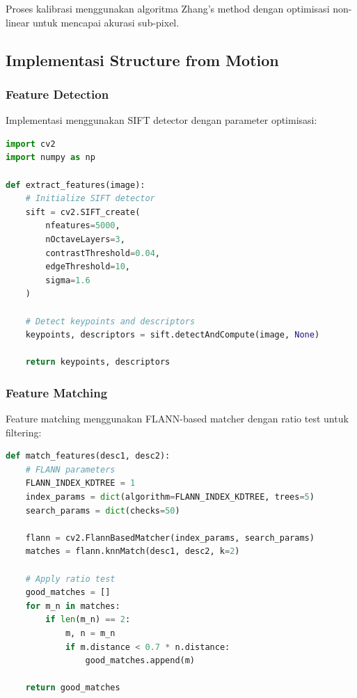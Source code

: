 \documentclass[12pt,a4paper]{article}
\begin{document}
Proses kalibrasi menggunakan algoritma Zhang's method dengan optimisasi non-linear untuk mencapai akurasi sub-pixel.

\subsection{Implementasi Structure from Motion}

\subsubsection{Feature Detection}

Implementasi menggunakan SIFT detector dengan parameter optimisasi:

\begin{lstlisting}[language=Python, caption=Implementasi SIFT Feature Detection]
import cv2
import numpy as np

def extract_features(image):
    # Initialize SIFT detector
    sift = cv2.SIFT_create(
        nfeatures=5000,
        nOctaveLayers=3,
        contrastThreshold=0.04,
        edgeThreshold=10,
        sigma=1.6
    )
    
    # Detect keypoints and descriptors
    keypoints, descriptors = sift.detectAndCompute(image, None)
    
    return keypoints, descriptors
\end{lstlisting}

\subsubsection{Feature Matching}

Feature matching menggunakan FLANN-based matcher dengan ratio test untuk filtering:

\begin{lstlisting}[language=Python, caption=Feature Matching Implementation]
def match_features(desc1, desc2):
    # FLANN parameters
    FLANN_INDEX_KDTREE = 1
    index_params = dict(algorithm=FLANN_INDEX_KDTREE, trees=5)
    search_params = dict(checks=50)
    
    flann = cv2.FlannBasedMatcher(index_params, search_params)
    matches = flann.knnMatch(desc1, desc2, k=2)
    
    # Apply ratio test
    good_matches = []
    for m_n in matches:
        if len(m_n) == 2:
            m, n = m_n
            if m.distance < 0.7 * n.distance:
                good_matches.append(m)
    
    return good_matches
\end{lstlisting}
\end{document}
